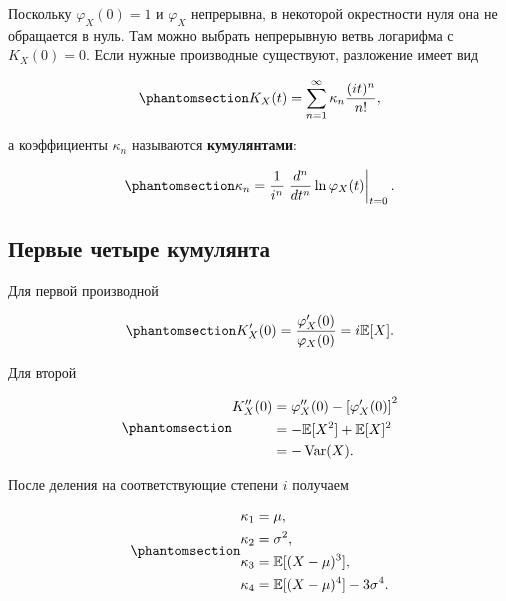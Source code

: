 \documentclass[
  russian,
  11pt,
  a4paper,
  open=any]{scrbook}
\begin{document}
Поскольку \(\varphi_X(0)=1\) и \(\varphi_X\) непрерывна, в некоторой
окрестности нуля она не обращается в нуль. Там можно выбрать непрерывную
ветвь логарифма с \(K_X(0)=0\). Если нужные производные существуют,
разложение имеет вид

\begin{equation}\protect\phantomsection\label{eq-cumulant-series}{
K_X(t)=
\sum_{n=1}^{\infty}
\kappa_n\frac{(it)^n}{n!},
}\end{equation}

а коэффициенты \(\kappa_n\) называются \textbf{кумулянтами}:

\begin{equation}\protect\phantomsection\label{eq-cumulants-from-characteristic}{
\kappa_n=
\frac{1}{i^n}
\left.
\frac{d^n}{dt^n}\ln\varphi_X(t)
\right|_{t=0}.
}\end{equation}

\subsection{Первые четыре
кумулянта}\label{ux43fux435ux440ux432ux44bux435-ux447ux435ux442ux44bux440ux435-ux43aux443ux43cux443ux43bux44fux43dux442ux430}

Для первой производной

\begin{equation}\protect\phantomsection\label{eq-first-cumulant-derivation}{
K_X'(0)=
\frac{\varphi_X'(0)}{\varphi_X(0)}
=i\mathbb E[X].
}\end{equation}

Для второй

\begin{equation}\protect\phantomsection\label{eq-second-cumulant-derivation}{
\begin{aligned}
K_X''(0)
&=\varphi_X''(0)-\left[\varphi_X'(0)\right]^2\\
&=-\mathbb E[X^2]+\mathbb E[X]^2\\
&=-\operatorname{Var}(X).
\end{aligned}
}\end{equation}

После деления на соответствующие степени \(i\) получаем

\begin{equation}\protect\phantomsection\label{eq-first-four-cumulants}{
\begin{aligned}
\kappa_1&=\mu,\\
\kappa_2&=\sigma^2,\\
\kappa_3&=\mathbb E[(X-\mu)^3],\\
\kappa_4&=\mathbb E[(X-\mu)^4]-3\sigma^4.
\end{aligned}
}\end{equation}
\end{document}
